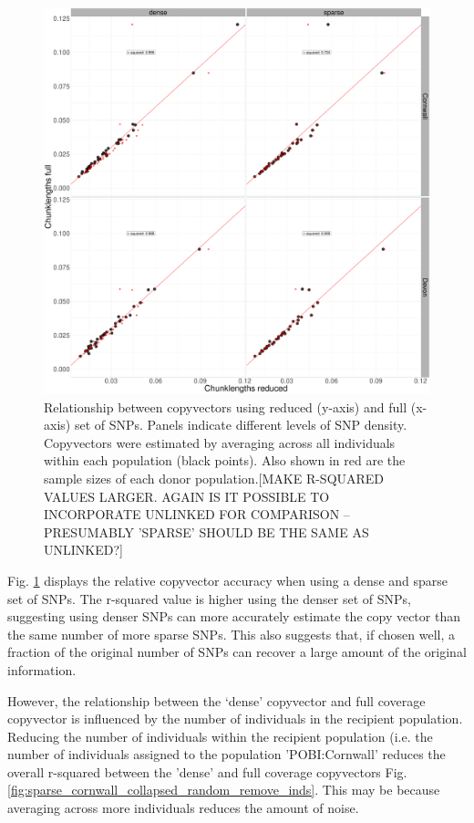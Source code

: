\begin{figure}[htp]
    \centering
    \includegraphics[width=1.0\textwidth]{../images/chapter1/dense_sparse_devon_cornwall_collapsed.pdf}
    \caption{Relationship between copyvectors using reduced (y-axis) and full (x-axis) set of SNPs. Panels indicate different levels of SNP density. Copyvectors were estimated by averaging across all individuals within each population (black points). Also shown in red are the sample sizes of each donor population.{\color{red}[MAKE R-SQUARED VALUES LARGER. AGAIN IS IT POSSIBLE TO INCORPORATE UNLINKED FOR COMPARISON -- PRESUMABLY 'SPARSE' SHOULD BE THE SAME AS UNLINKED?]}}
    \label{fig:dense_sparse_devon_cornwall_collapsed}
\end{figure}

Fig. \ref{fig:dense_sparse_devon_cornwall_collapsed} displays the relative copyvector accuracy when using a dense and sparse set of SNPs. The r-squared value is higher using the denser set of SNPs, suggesting using denser SNPs can more accurately estimate the copy vector than the same number of more sparse SNPs. This also suggests that, if chosen well, a fraction of the original number of SNPs can recover a large amount of the original information. 

However, the relationship between the `dense' copyvector and full coverage copyvector is influenced by the number of individuals in the recipient population. Reducing the number of individuals within the recipient population (i.e. the number of individuals assigned to the population 'POBI:Cornwall' reduces the overall r-squared between the 'dense' and full coverage copyvectors Fig. \ref{fig:sparse_cornwall_collapsed_random_remove_inds}. This may be because averaging across more individuals reduces the amount of noise. 

